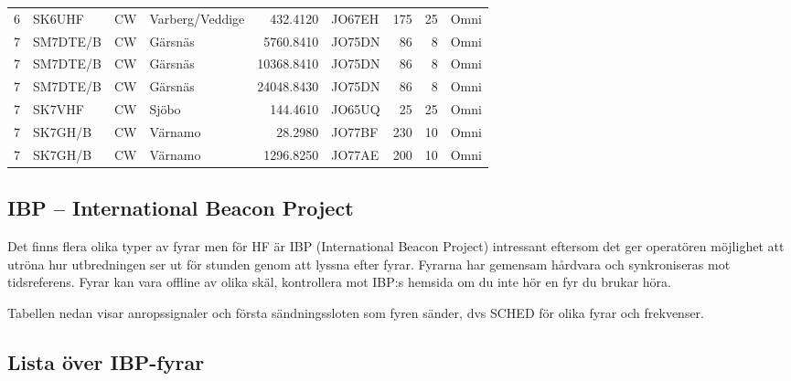 \begin{landscape}
\begin{longtable}{rlllrlrrl}
	                 6 & SK6UHF     & CW      & Varberg/Veddige        &     432.4120 & JO67EH      &      175 &       25 & Omni         \\
	                 7 & SM7DTE/B   & CW      & Gärsnäs                &    5760.8410 & JO75DN      &       86 &        8 & Omni         \\
	                 7 & SM7DTE/B   & CW      & Gärsnäs                &   10368.8410 & JO75DN      &       86 &        8 & Omni         \\
	                 7 & SM7DTE/B   & CW      & Gärsnäs                &   24048.8430 & JO75DN      &       86 &        8 & Omni         \\
	                 7 & SK7VHF     & CW      & Sjöbo                  &     144.4610 & JO65UQ      &       25 &       25 & Omni         \\
	                 7 & SK7GH/B    & CW      & Värnamo                &      28.2980 & JO77BF      &      230 &       10 & Omni         \\
	                 7 & SK7GH/B    & CW      & Värnamo                &    1296.8250 & JO77AE      &      200 &       10 & Omni
\end{longtable}
\end{landscape}

\clearpage

\subsection{IBP -- International Beacon Project}

Det finns flera olika typer av fyrar men för HF är IBP (International Beacon
Project) intressant eftersom det ger operatören möjlighet att utröna hur
utbredningen ser ut för stunden genom att lyssna efter fyrar. Fyrarna har
gemensam hårdvara och synkroniseras mot tidsreferens. Fyrar kan vara offline
av olika skäl, kontrollera mot IBP:s hemsida om du inte hör en fyr du brukar
höra.

Tabellen nedan visar anropssignaler och första sändningssloten som fyren
sänder, dvs SCHED för olika fyrar och frekvenser.

\subsection{Lista över IBP-fyrar}

